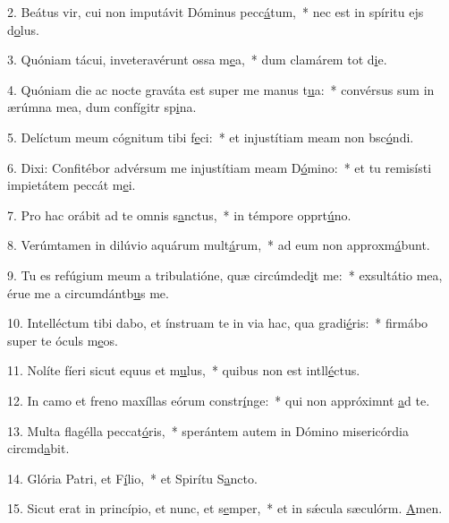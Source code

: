 2. Beátus vir, cui non imputávit Dóminus pecc\uline{á}tum,~* nec est in spíritu ejs d\uline{o}lus.\par 
3. Quóniam tácui, inveteravérunt ossa m\uline{e}a,~* dum clamárem tot d\uline{i}e.\par 
4. Quóniam die ac nocte graváta est super me manus t\uline{u}a:~* convérsus sum in ærúmna mea, dum confígitr sp\uline{i}na.\par 
5. Delíctum meum cógnitum tibi f\uline{e}ci:~* et injustítiam meam non bsc\uline{ó}ndi.\par 
6. Dixi: Confitébor advérsum me injustítiam meam D\uline{ó}mino:~* et tu remisísti impietátem peccát m\uline{e}i.\par 
7. Pro hac orábit ad te omnis s\uline{a}nctus,~* in témpore opprt\uline{ú}no.\par 
8. Verúmtamen in dilúvio aquárum mult\uline{á}rum,~* ad eum non approxm\uline{á}bunt.\par 
9. Tu es refúgium meum a tribulatióne, quæ circúmded\uline{i}t me:~* exsultátio mea, érue me a circumdántb\uline{u}s me.\par 
10. Intelléctum tibi dabo, et ínstruam te in via hac, qua gradi\uline{é}ris:~* firmábo super te óculs m\uline{e}os.\par 
11. Nolíte fíeri sicut equus et m\uline{u}lus,~* quibus non est intll\uline{é}ctus.\par 
12. In camo et freno maxíllas eórum constr\uline{í}nge:~* qui non appróximnt \uline{a}d te.\par 
13. Multa flagélla peccat\uline{ó}ris,~* sperántem autem in Dómino misericórdia circmd\uline{a}bit.\par 
14. Glória Patri, et F\uline{í}lio,~* et Spirítu S\uline{a}ncto.\par 
15. Sicut erat in princípio, et nunc, et s\uline{e}mper,~* et in sǽcula sæculórm. \uline{A}men.\par 
